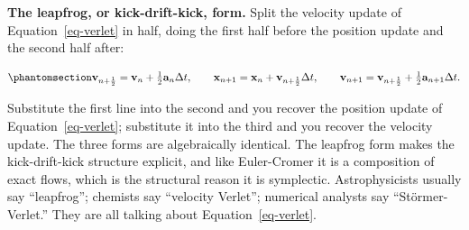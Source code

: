 \documentclass[
  10.5pt,
  letterpaper,
]{scrbook}
\theoremstyle{plain}
\theoremstyle{remark}
\begin{document}
\textbf{The leapfrog, or kick-drift-kick, form.} Split the velocity
update of Equation~\ref{eq-verlet} in half, doing the first half before
the position update and the second half after:

\begin{equation}\protect\phantomsection\label{eq-leapfrog}{
\mathbf{v}_{n+\frac12} = \mathbf{v}_n + \tfrac12\mathbf{a}_n\Delta t, \qquad
\mathbf{x}_{n+1} = \mathbf{x}_n + \mathbf{v}_{n+\frac12}\Delta t, \qquad
\mathbf{v}_{n+1} = \mathbf{v}_{n+\frac12} + \tfrac12\mathbf{a}_{n+1}\Delta t.
}\end{equation}

Substitute the first line into the second and you recover the position
update of Equation~\ref{eq-verlet}; substitute it into the third and you
recover the velocity update. The three forms are algebraically
identical. The leapfrog form makes the kick-drift-kick structure
explicit, and like Euler-Cromer it is a composition of exact flows,
which is the structural reason it is symplectic. Astrophysicists usually
say ``leapfrog''; chemists say ``velocity Verlet''; numerical analysts
say ``Störmer-Verlet.'' They are all talking about
Equation~\ref{eq-verlet}.
\end{document}

